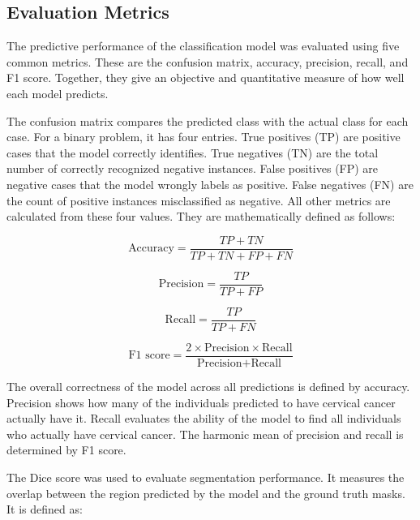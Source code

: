 \documentclass[pdflatex,sn-nature]{sn-jnl}%
\theoremstyle{thmstyleone}%
\theoremstyle{thmstyletwo}%
\theoremstyle{thmstylethree}%
\begin{document}
\subsection{Evaluation Metrics}
The predictive performance of the classification model was evaluated using five common metrics. These are the confusion matrix, accuracy, precision, recall, and F1 score. Together, they give an objective and quantitative measure of how well each model predicts.

The confusion matrix compares the predicted class with the actual class for each case. For a binary problem, it has four entries. True positives (TP) are positive cases that the model correctly identifies. True negatives (TN) are the total number of correctly recognized negative instances. False positives (FP) are negative cases that the model wrongly labels as positive. False negatives (FN) are the count of positive instances misclassified as negative. All other metrics are calculated from these four values. They are mathematically defined as follows:

\begin{equation}
    \text{Accuracy} = \frac{TP + TN}{TP + TN + FP + FN}
    \label{eq:accuracy}
\end{equation}

\begin{equation}
    \text{Precision} = \frac{TP}{TP + FP}
    \label{eq:precision}
\end{equation}

\begin{equation}
    \text{Recall} = \frac{TP}{TP + FN}
    \label{eq:recall}
\end{equation}

\begin{equation}
    \text{F1 score} = \frac{2 \times \text{Precision} \times \text{Recall}}{\text{Precision} + \text{Recall}}
    \label{eq:f1}
\end{equation}

The overall correctness of the model across all predictions is defined by accuracy. Precision shows how many of the individuals predicted to have cervical cancer actually have it. Recall evaluates the ability of the model to find all individuals who actually have cervical cancer. The harmonic mean of precision and recall is determined by F1 score.


The Dice score was used to evaluate segmentation performance. It measures the overlap between the region predicted by the model and the ground truth masks. It is defined as:
\end{document}

